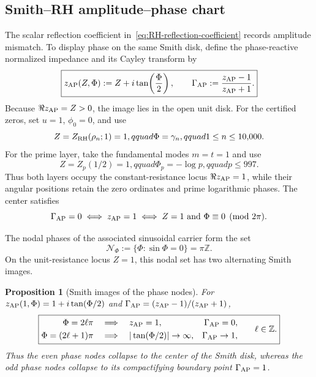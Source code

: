 \documentclass[11pt]{article}
\newtheorem{proposition}[definition]{Proposition}
\begin{document}
\subsection{Smith--RH amplitude--phase chart}
The scalar reflection coefficient in~\eqref{eq:RH-reflection-coefficient} records amplitude
mismatch.  To display phase on the same Smith disk, define the phase-reactive normalized
impedance and its Cayley transform by
\begin{equation}\label{eq:smith-rh-map}
 \boxed{
 z_{\rm AP}(Z,\Phi):=Z+i\tan\!\left(\frac{\Phi}{2}\right),\qquad
 \Gamma_{\rm AP}:=\frac{z_{\rm AP}-1}{z_{\rm AP}+1}.}
\end{equation}
Because $\Re z_{\rm AP}=Z>0$, the image lies in the open unit disk.  For the certified zeros,
set $u=1$, $\phi_0=0$, and use
\begin{equation}\label{eq:smith-zero-layer}
 Z=Z_{\rm RH}(\rho_n;1)=1,qquad \Phi=\gamma_n,qquad 1\le n\le10{,}000.
\end{equation}
For the prime layer, take the fundamental modes $m=t=1$ and use
\begin{equation}\label{eq:smith-prime-layer}
 Z=Z_p(1/2)=1,qquad \Phi_p=-\log p,qquad p\le997.
\end{equation}
Thus both layers occupy the constant-resistance locus $\Re z_{\rm AP}=1$, while their angular
positions retain the zero ordinates and prime logarithmic phases.  The center satisfies
\begin{equation}\label{eq:smith-center-node}
 \Gamma_{\rm AP}=0
 \iff z_{\rm AP}=1
 \iff Z=1\ \text{and}\ \Phi\equiv0\pmod{2\pi}.
\end{equation}

The nodal phases of the associated sinusoidal carrier form the set
\begin{equation}\label{eq:smith-nodal-phase-set}
 \mathcal N_\Phi:=\{\Phi:\sin\Phi=0\}=\pi\mathbb Z.
\end{equation}
On the unit-resistance locus $Z=1$, this nodal set has two alternating Smith images.
\begin{proposition}[Smith images of the phase nodes]\label{prop:smith-nodal-loci}
For $z_{\rm AP}(1,\Phi)=1+i\tan(\Phi/2)$ and
$\Gamma_{\rm AP}=(z_{\rm AP}-1)/(z_{\rm AP}+1)$,
\begin{equation}\label{eq:smith-even-odd-nodes}
 \boxed{
 \begin{aligned}
  \Phi=2\ell\pi
   &\quad\Longrightarrow\quad z_{\rm AP}=1,
      &\Gamma_{\rm AP}=0,\\
  \Phi=(2\ell+1)\pi
   &\quad\Longrightarrow\quad |\tan(\Phi/2)|\to\infty,
      &\Gamma_{\rm AP}\to1,
 \end{aligned}\qquad \ell\in\mathbb Z.}
\end{equation}
Thus the even phase nodes collapse to the center of the Smith disk, whereas the odd phase
nodes collapse to its compactifying boundary point $\Gamma_{\rm AP}=1$.
\end{proposition}
\end{document}
